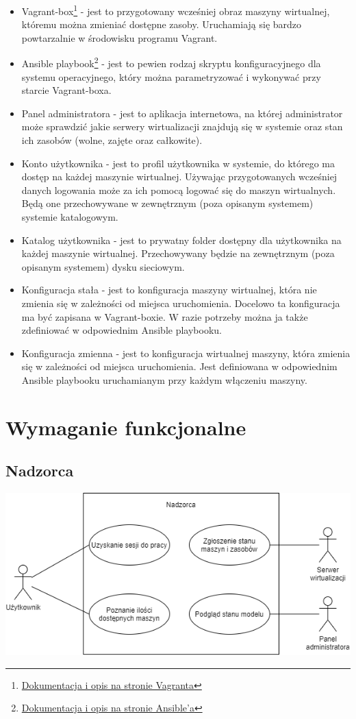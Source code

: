 \documentclass[12pt]{article}
\begin{document}
\begin{itemize}
	\item Vagrant-box\footnote{\href{https://www.vagrantup.com/docs/boxes}{Dokumentacja i opis na stronie Vagranta}} - jest to przygotowany wcześniej obraz maszyny wirtualnej, któremu można zmieniać dostępne zasoby. Uruchamiają się bardzo powtarzalnie w środowisku programu Vagrant.
	\item Ansible playbook\footnote{\href{https://www.redhat.com/en/topics/automation/what-is-an-ansible-playbook\#example-of-ansible-playbook}{Dokumentacja i opis na stronie Ansible'a}} - jest to pewien rodzaj skryptu konfiguracyjnego dla systemu operacyjnego, który można parametryzować i wykonywać przy starcie Vagrant-boxa.
	\item Panel administratora - jest to aplikacja internetowa, na której administrator może sprawdzić jakie serwery wirtualizacji znajdują się w systemie oraz stan ich zasobów (wolne, zajęte oraz całkowite).
	\item Konto użytkownika - jest to profil użytkownika w systemie, do którego ma dostęp na każdej maszynie wirtualnej. Używając przygotowanych wcześniej danych logowania może za ich pomocą logować się do maszyn wirtualnych. Będą one przechowywane w zewnętrznym (poza opisanym systemem) systemie katalogowym.
	\item Katalog użytkownika - jest to prywatny folder dostępny dla użytkownika na każdej maszynie wirtualnej. Przechowywany będzie na zewnętrznym (poza opisanym systemem) dysku sieciowym.
	\item Konfiguracja stała - jest to konfiguracja maszyny wirtualnej, która nie zmienia się w zależności od miejsca uruchomienia. Docelowo ta konfiguracja ma być zapisana w Vagrant-boxie. W razie potrzeby można ja także zdefiniować w odpowiednim Ansible playbooku.
	\item Konfiguracja zmienna - jest to konfiguracja wirtualnej maszyny, która zmienia się w zależności od miejsca uruchomienia. Jest definiowana w odpowiednim Ansible playbooku uruchamianym przy każdym włączeniu maszyny.
\end{itemize}

\section{Wymaganie funkcjonalne}
\subsection{Nadzorca}
\includegraphics[width=\textwidth]{../diagrams/use_cases/overseer.png}
\end{document}

